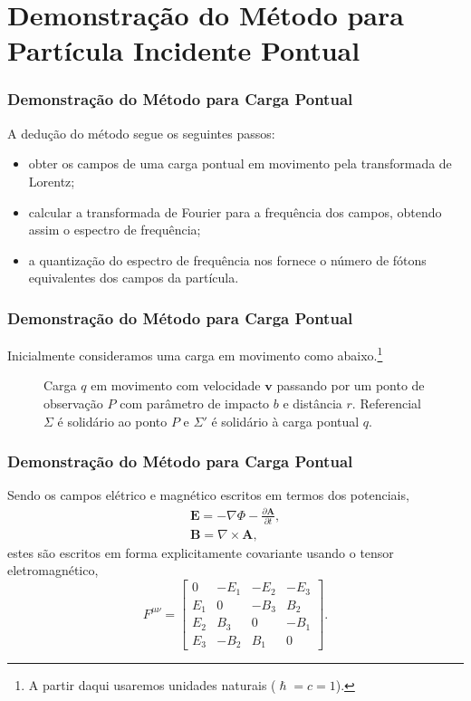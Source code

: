 \documentclass[xcolor=dvipsnames]{beamer}
\renewcommand{\vec}{\mathbf}
\begin{document}
\section{Demonstração do Método para Partícula Incidente Pontual}
\begin{frame}
	\frametitle{Demonstração do Método para Carga Pontual}
	A dedução do método segue os seguintes passos:
	\begin{itemize}
		\item obter os campos de uma carga pontual em movimento pela
			transformada de Lorentz;
		\item calcular a transformada de Fourier para a frequência dos campos,
			obtendo assim o espectro de frequência;
		\item a quantização do espectro de frequência nos fornece o número de
			fótons equivalentes dos campos da partícula.
	\end{itemize}
\end{frame}

\begin{frame}
	\frametitle{Demonstração do Método para Carga Pontual}
	Inicialmente consideramos uma carga em movimento como abaixo.\footnote{A
	partir daqui usaremos unidades naturais ($\hslash = c = 1$).}
	\begin{figure}
	
	\caption{Carga $q$ em movimento com velocidade $\vec{v}$ passando por um
		ponto de observação $P$ com parâmetro de impacto $b$ e distância $r$.
		Referencial $\Sigma$ é solidário ao ponto $P$ e $\Sigma '$ é solidário
		à carga pontual $q$.}
	\end{figure}
\end{frame}

\begin{frame}
	\frametitle{Demonstração do Método para Carga Pontual}
	Sendo os campos elétrico e magnético escritos em termos dos potenciais,
	\begin{gather}
		\vec{E} = - \nabla \Phi - \frac{\partial \vec{A}}{\partial t}, \\
		\vec{B} = \nabla \times \vec{A},
	\end{gather}
	estes são escritos em forma explicitamente covariante usando o tensor
	eletromagnético,
	\begin{equation}
		F^{\mu \nu} = \begin{bmatrix}
			0 & -E_1 & -E_2 & -E_3 \\
			E_1 & 0 & -B_3 & B_2 \\
			E_2 & B_3 & 0 & -B_1 \\
			E_3 & -B_2 & B_1 & 0
		\end{bmatrix}.
	\end{equation}
\end{frame}
\end{document}
